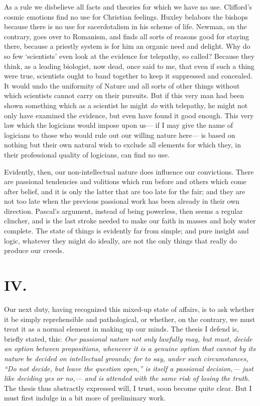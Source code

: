 \documentclass[12pt]{article}
\begin{document}
As a rule we disbelieve all facts and theories for which we have no use.  Clifford's cosmic emotions find no use for Christian feelings. Huxley belabors the bishops because there is no use for sacerdotalism in his scheme of life.  Newman, on the contrary, goes over to Romanism, and finds all sorts of reasons good for staying there, because a priestly system is for him an organic need and delight.  Why do so few `scientists' even look at the evidence for telepathy, so called? Because they think, as a leading biologist, now dead, once said to me, that even if such a thing were true, scientists ought to band together to keep it suppressed and concealed.  It would undo the uniformity of Nature and all sorts of other things without which scientists cannot carry on their pursuits.  But if this very man had been shown something which as a scientist he might \emph{do} with telepathy, he might not only have examined the evidence, but even have found it good enough.  This very law which the logicians would impose upon us--- if I may give the name of logicians to those who would rule out our willing nature here--- is based on nothing but their own natural wish to exclude all elements for  which they, in their professional quality of logicians, can find no use.

Evidently, then, our non-intellectual nature does influence our convictions.  There are passional tendencies and volitions which run before and others which come after belief, and it is only the latter that are too late for the fair; and they are not too late when the previous passional work has been already in their own direction. Pascal's argument, instead of being powerless, then seems a regular clincher, and is the last stroke needed to make our faith in masses and holy water complete.  The state of things is evidently far from simple; and pure insight and logic, whatever they might do ideally, are not the only things that really do produce our creeds.

\section*{IV.}

Our next duty, having recognized this mixed-up state of affairs, is to ask whether it be simply reprehensible and pathological, or whether, on the contrary, we must treat it as a normal element in making up our minds.  The thesis I defend is, briefly stated, this:  \emph{Our passional nature not only lawfully may, but must, decide an option between propositions, whenever it is a genuine option that cannot by its nature be decided on intellectual grounds; for to say, under such circumstances, ``Do not decide, but leave the question open,'' is itself a passional decision,--- just like deciding yes or no,--- and is attended with the same risk of losing the truth}.  The thesis thus abstractly expressed will, I trust, soon become quite clear.  But I must first indulge in a bit more of preliminary work.
\end{document}
